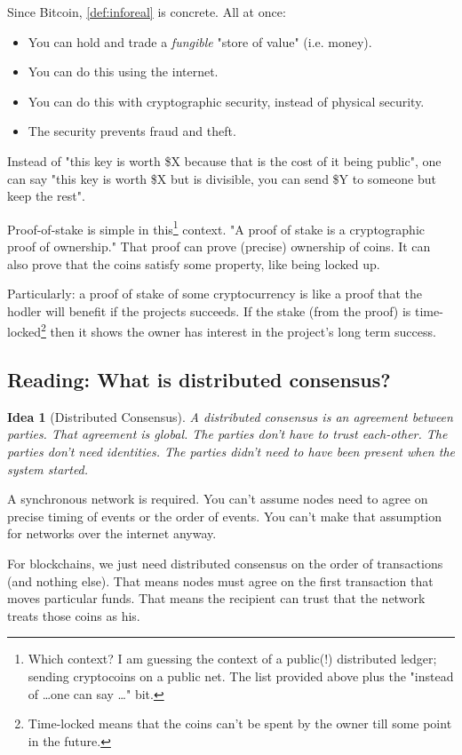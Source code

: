 \documentclass{article}
\newtheorem{idea}{Idea}
\begin{document}
Since Bitcoin, \cref{def:inforeal} is concrete.
All at once:
\begin{itemize}
    \item You can hold and trade a \emph{fungible} "store of value" (i.e. money).
    \item You can do this using the internet.
    \item You can do this with cryptographic security, instead of physical security.
    \item The security prevents fraud and theft.
\end{itemize}
Instead of "this key is worth \$X because that is the cost of it being public", one can say "this key is worth \$X but is divisible, you can send \$Y to someone but keep the rest".

Proof-of-stake is simple in this\footnote{Which context? I am guessing the context of a public(!) distributed ledger; sending cryptocoins on a public net. The list provided above plus the "instead of \dots one can say \dots" bit.} context. "A proof of stake is a cryptographic proof of ownership."
That proof can prove (precise) ownership of coins. It can also prove that the coins satisfy some property, like being locked up.

Particularly: a proof of stake of some cryptocurrency is like a proof that the hodler will benefit if the projects succeeds. If the stake (from the proof) is time-locked\footnote{Time-locked means that the coins can't be spent by the owner till some point in the future.} then it shows the owner has interest in the project's long term success.

\subsection{Reading: What is distributed consensus?}

\begin{idea}[Distributed Consensus]
    A \emph{distributed consensus} is an agreement between parties. That agreement is global. The parties don't have to trust each-other. The parties don't need identities. The parties didn't need to have been present when the system started.
\end{idea}

A synchronous network is required. You can't assume nodes need to agree on precise timing of events or the order of events. You can't make that assumption for networks over the internet anyway.

For blockchains, we just need distributed consensus on the order of transactions (and nothing else). That means nodes must agree on the first transaction that moves particular funds. That means the recipient can trust that the network treats those coins as his.
\end{document}
